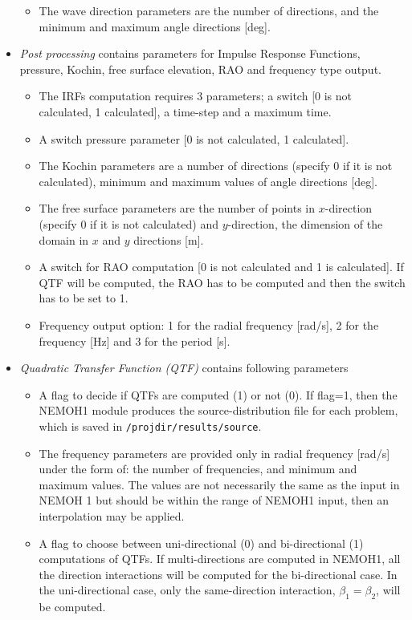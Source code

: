 \documentclass[12pt,a4paper,titlepage]{article}
\begin{document}
\begin{itemize}
\begin{itemize}
\item The wave direction parameters are the number of directions, and the minimum and maximum angle directions [deg].
\end{itemize}
\item \emph{Post processing} contains parameters for Impulse Response Functions, pressure, Kochin, free surface elevation, RAO and frequency type output.
\begin{itemize}
\item The IRFs computation requires 3 parameters; a switch [0 is not calculated, 1 calculated], a time-step and a maximum time.
\item A switch pressure parameter [0 is not calculated, 1 calculated].
\item The Kochin parameters are a number of directions (specify 0 if it is not calculated), minimum and maximum values of angle directions [deg].
\item The free surface parameters are the number of points in $x$-direction (specify 0 if it is not calculated) and $y$-direction, the dimension of the domain in $x$ and $y$ directions [m].
\item A switch for RAO computation [0 is not calculated and 1 is calculated]. If QTF will be computed, the RAO has to be computed and then the switch has to be set to 1.
\item Frequency output option: 1 for the radial frequency [rad/s], 2 for the frequency [Hz] and 3 for the period [s]. 
\end{itemize}
\item \emph{Quadratic Transfer Function (QTF)} contains following parameters
\begin{itemize}
\item A flag to decide if QTFs are computed (1) or not (0). If flag=1, then the NEMOH1 module produces the source-distribution file for each problem, which is saved in \texttt{/projdir/results/source}.
\item The frequency parameters are provided only in radial frequency [rad/s] under the form of: the number of frequencies, and minimum and maximum values. The values are not necessarily the same as the input in NEMOH 1 but should be within the range of NEMOH1 input, then an interpolation may be applied.
\item A flag to choose between uni-directional (0) and bi-directional (1) computations of QTFs. If multi-directions are computed in NEMOH1, all the direction interactions will be computed for the bi-directional case. In the uni-directional case, only the same-direction interaction, $\beta_1=\beta_2$, will be computed.

\end{itemize}
\end{itemize}
\end{document}
